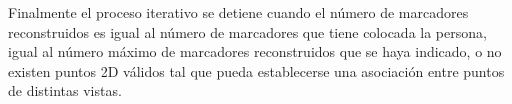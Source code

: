 Finalmente el proceso iterativo se detiene cuando el número de marcadores reconstruidos es igual al número de marcadores que tiene colocada la persona, igual al número máximo de marcadores reconstruidos que se haya indicado, o no existen puntos 2D válidos tal que pueda establecerse una asociación entre puntos de distintas vistas.